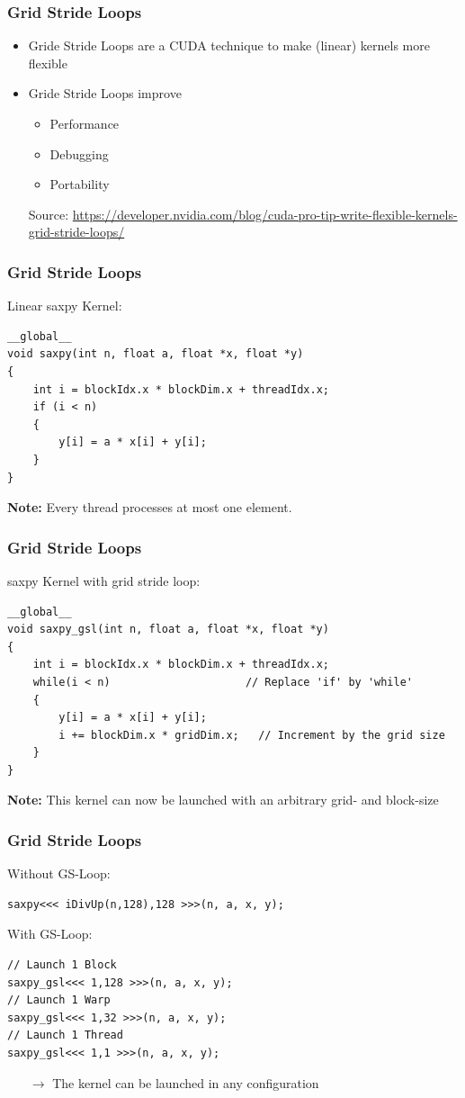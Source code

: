 \documentclass[aspectratio=169,handout]{beamer}
\begin{document}
\begin{frame}[fragile]
\frametitle{Grid Stride Loops}

\begin{itemize}
\item Gride Stride Loops are a CUDA technique to make (linear) kernels more flexible
\item Gride Stride Loops improve
\begin{itemize}
\item Performance
\item Debugging
\item Portability
\end{itemize}
Source: \url{https://developer.nvidia.com/blog/cuda-pro-tip-write-flexible-kernels-grid-stride-loops/}
\end{itemize}
\end{frame}


\begin{frame}[fragile]
\frametitle{Grid Stride Loops}
Linear saxpy Kernel:
\begin{lstlisting}
__global__
void saxpy(int n, float a, float *x, float *y)
{
	int i = blockIdx.x * blockDim.x + threadIdx.x;
	if (i < n) 
	{
		y[i] = a * x[i] + y[i];
	}
}
\end{lstlisting}
\textbf{Note:} Every thread processes at most one element.
\end{frame}


\begin{frame}[fragile]
\frametitle{Grid Stride Loops}
saxpy Kernel with grid stride loop:
\begin{lstlisting}
__global__
void saxpy_gsl(int n, float a, float *x, float *y)
{
	int i = blockIdx.x * blockDim.x + threadIdx.x; 
	while(i < n)                     // Replace 'if' by 'while'
	{
		y[i] = a * x[i] + y[i];
		i += blockDim.x * gridDim.x;   // Increment by the grid size
	}
}
\end{lstlisting}
\textbf{Note:} This kernel can now be launched with an arbitrary grid- and block-size
\end{frame}




\begin{frame}[fragile]
\frametitle{Grid Stride Loops}
Without GS-Loop:
\begin{lstlisting}
saxpy<<< iDivUp(n,128),128 >>>(n, a, x, y);
\end{lstlisting}
With GS-Loop:
\begin{lstlisting}
// Launch 1 Block
saxpy_gsl<<< 1,128 >>>(n, a, x, y);
// Launch 1 Warp
saxpy_gsl<<< 1,32 >>>(n, a, x, y);
// Launch 1 Thread
saxpy_gsl<<< 1,1 >>>(n, a, x, y);
\end{lstlisting}
\begin{itemize}
	\item[$\rightarrow$] The kernel can be launched in any configuration
\end{itemize}
\end{frame}
\end{document}
